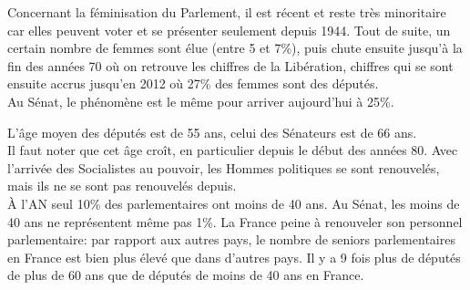 \documentclass[12pt, a4paper, openany]{book}
\begin{document}
Concernant la féminisation du Parlement, il est récent et reste très minoritaire car elles peuvent voter et se présenter seulement depuis 1944. Tout de suite, un certain nombre de femmes sont élue (entre 5 et 7\%), puis chute ensuite jusqu'à la fin des années 70 où on retrouve les chiffres de la Libération, chiffres qui se sont ensuite accrus jusqu'en 2012 où 27\% des femmes sont des députés. \\
Au Sénat, le phénomène est le même pour arriver aujourd'hui à 25\%. 


L'âge moyen des députés est de 55 ans, celui des Sénateurs est de 66 ans. \\
Il faut noter que cet âge croît, en particulier depuis le début des années 80. Avec l'arrivée des Socialistes au pouvoir, les Hommes politiques se sont renouvelés, mais ils ne se sont pas renouvelés depuis. \\
À l'AN seul 10\% des parlementaires ont moins de 40 ans. Au Sénat, les moins de 40 ans ne représentent même pas 1\%. La France peine à renouveler son personnel parlementaire: par rapport aux autres pays, le nombre de seniors parlementaires en France est bien plus élevé que dans d'autres pays. Il y a 9 fois plus de députés de plus de 60 ans que de députés de moins de 40 ans en France. 
\end{document}

